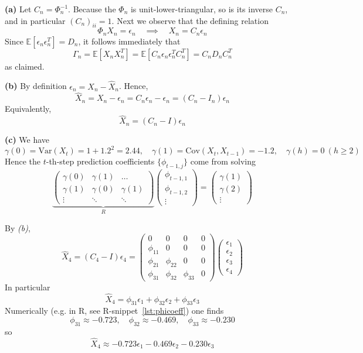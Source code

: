 \documentclass[11pt,a4paper]{article}
\newcommand{\EE}{\mathbb E}
\newcommand{\var}{\mathrm{Var}}
\newcommand{\cov}{\mathrm{Cov}}
\begin{document}
    \noindent \textbf{(a)} Let $C_n = \Phi_n^{-1}$. Because the $\Phi_n$ is unit-lower-triangular, so is its inverse $C_n$, and in particular $(C_n)_{ii} = 1$. Next we observe that the defining relation
    \[ \Phi_n X_n = \epsilon_n \quad \implies \quad X_n = C_n \epsilon_n \]
    Since $\EE[\epsilon_n \epsilon_n^T] = D_n$, it follows immediately that
    \[ \Gamma_n = \EE[X_n X_n^T] = \EE[C_n \epsilon_n \epsilon_n^T C_n^T] = C_n D_n C_n^T \]
    as claimed.

    \noindent \textbf{(b)} By definition $\epsilon_n = X_n - \hat X_n$. Hence,
    \[ \hat X_n = X_n - \epsilon_n = C_n \epsilon_n - \epsilon_n = (C_n - I_n) \epsilon_n \]
    Equivalently,
    \[ \hat X_n = (C_n - I) \epsilon_n \]

    \noindent \textbf{(c)} We have
    \[ \gamma(0) = \var(X_t) = 1 + 1.2^2 = 2.44, \quad \gamma(1) = \cov(X_t, X_{t-1}) = -1.2, \quad \gamma(h) = 0 \ (h \ge 2) \]
    Hence the $t$-th-step prediction coefficients $\{\phi_{t-1,j}\}$ come from solving
    \[ \underbrace{\begin{pmatrix} \gamma(0) & \gamma(1) & \ldots \\ \gamma(1) & \gamma(0) & \gamma(1) \\ \vdots & \ddots & \ddots \end{pmatrix}}_{R} \begin{pmatrix} \phi_{t-1,1} \\ \phi_{t-1,2} \\ \vdots \end{pmatrix} = \begin{pmatrix} \gamma(1) \\ \gamma(2) \\ \vdots \end{pmatrix} \]
    
    By \emph{(b)},
    \[ \hat X_4 = (C_4 - I) \epsilon_4 = \begin{pmatrix} 0 & 0 & 0 & 0 \\ \phi_{11} & 0 & 0 & 0 \\ \phi_{21} & \phi_{22} & 0 & 0 \\ \phi_{31} & \phi_{32} & \phi_{33} & 0 \end{pmatrix} \begin{pmatrix} \epsilon_1 \\ \epsilon_2 \\ \epsilon_3 \\ \epsilon_4 \end{pmatrix} \]
    In particular
    \[ \hat X_4 = \phi_{31} \epsilon_1 + \phi_{32} \epsilon_2 + \phi_{33} \epsilon_3 \]
    Numerically (e.g. in R, see R-snippet~\ref{lst:phicoeff}) one finds
    \[ \phi_{31} \approx -0.723, \quad \phi_{32} \approx -0.469, \quad \phi_{33} \approx -0.230 \]
    so \[ \hat X_4 \approx -0.723 \epsilon_1 - 0.469 \epsilon_2 - 0.230 \epsilon_3 \]
\end{document}
